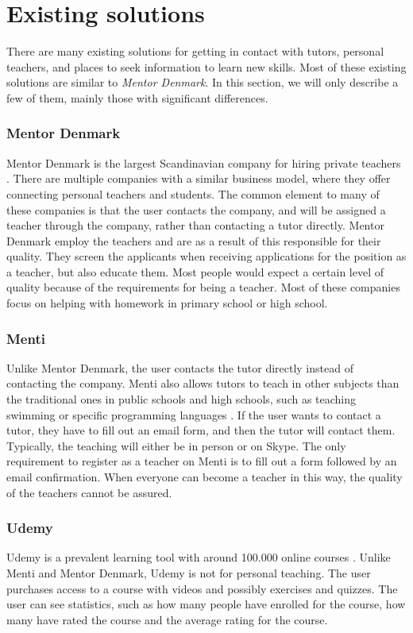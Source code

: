 \section{Existing solutions}
There are many existing solutions for getting in contact with tutors, personal teachers, and places to seek information to learn new skills.
Most of these existing solutions are similar to \textit{Mentor Denmark}.  
In this section, we will only describe a few of them, mainly those with significant differences.

\subsubsection{Mentor Denmark}
Mentor Denmark is the largest Scandinavian company for hiring private teachers \cite{skandinaviens-stoeste-lektiefirma}.
There are multiple companies with a similar business model, where they offer connecting personal teachers and students.
The common element to many of these companies is that the user contacts the company, and will be assigned a teacher through the company, rather than contacting a tutor directly.
Mentor Denmark employ the teachers and are as a result of this responsible for their quality. 
They screen the applicants when receiving applications for the position as a teacher, but also educate them.
Most people would expect a certain level of quality because of the requirements for being a teacher.
Most of these companies focus on helping with homework in primary school or high school.

\subsubsection{Menti}
Unlike Mentor Denmark, the user contacts the tutor directly instead of contacting the company.
Menti also allows tutors to teach in other subjects than the traditional ones in public schools and high schools, such as teaching swimming or specific programming languages \cite{menti}.
If the user wants to contact a tutor, they have to fill out an email form, and then the tutor will contact them.
Typically, the teaching will either be in person or on Skype.
The only requirement to register as a teacher on Menti is to fill out a form followed by an email confirmation.
When everyone can become a teacher in this way, the quality of the teachers cannot be assured.

\subsubsection{Udemy}
Udemy is a prevalent learning tool with around 100.000 online courses \cite{udemy}.
Unlike Menti and Mentor Denmark, Udemy is not for personal teaching. 
The user purchases access to a course with videos and possibly exercises and quizzes. 
The user can see statistics, such as how many people have enrolled for the course, how many have rated the course and the average rating for the course.

